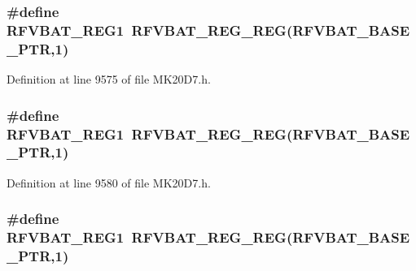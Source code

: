 \subsubsection[{\texorpdfstring{R\+F\+V\+B\+A\+T\+\_\+\+R\+E\+G1}{RFVBAT_REG1}}]{\setlength{\rightskip}{0pt plus 5cm}\#define R\+F\+V\+B\+A\+T\+\_\+\+R\+E\+G1~{\bf R\+F\+V\+B\+A\+T\+\_\+\+R\+E\+G\+\_\+\+R\+EG}({\bf R\+F\+V\+B\+A\+T\+\_\+\+B\+A\+S\+E\+\_\+\+P\+TR},1)}\hypertarget{group___r_f_v_b_a_t___register___accessor___macros_gaad1d344fc43c23927596453cbbfbe87f}{}\label{group___r_f_v_b_a_t___register___accessor___macros_gaad1d344fc43c23927596453cbbfbe87f}


Definition at line 9575 of file M\+K20\+D7.\+h.

\subsubsection[{\texorpdfstring{R\+F\+V\+B\+A\+T\+\_\+\+R\+E\+G1}{RFVBAT_REG1}}]{\setlength{\rightskip}{0pt plus 5cm}\#define R\+F\+V\+B\+A\+T\+\_\+\+R\+E\+G1~{\bf R\+F\+V\+B\+A\+T\+\_\+\+R\+E\+G\+\_\+\+R\+EG}({\bf R\+F\+V\+B\+A\+T\+\_\+\+B\+A\+S\+E\+\_\+\+P\+TR},1)}\hypertarget{group___r_f_v_b_a_t___register___accessor___macros_gaad1d344fc43c23927596453cbbfbe87f}{}\label{group___r_f_v_b_a_t___register___accessor___macros_gaad1d344fc43c23927596453cbbfbe87f}


Definition at line 9580 of file M\+K20\+D7.\+h.

\subsubsection[{\texorpdfstring{R\+F\+V\+B\+A\+T\+\_\+\+R\+E\+G1}{RFVBAT_REG1}}]{\setlength{\rightskip}{0pt plus 5cm}\#define R\+F\+V\+B\+A\+T\+\_\+\+R\+E\+G1~{\bf R\+F\+V\+B\+A\+T\+\_\+\+R\+E\+G\+\_\+\+R\+EG}({\bf R\+F\+V\+B\+A\+T\+\_\+\+B\+A\+S\+E\+\_\+\+P\+TR},1)}\hypertarget{group___r_f_v_b_a_t___register___accessor___macros_gaad1d344fc43c23927596453cbbfbe87f}{}\label{group___r_f_v_b_a_t___register___accessor___macros_gaad1d344fc43c23927596453cbbfbe87f}


